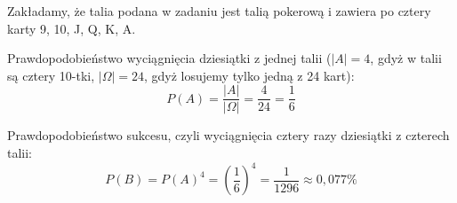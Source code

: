 \medskip
{} 
\medskip

Zakładamy, że talia podana w zadaniu jest talią pokerową i zawiera po cztery karty 9, 10, J, Q, K, A.

Prawdopodobieństwo wyciągnięcia dziesiątki z jednej talii ($|A|=4$, gdyż w talii są cztery 10-tki, $|\Omega|=24$, gdyż losujemy tylko jedną z 24 kart):
$$
P(A)=\frac{|A|}{|\Omega|}=\frac{4}{24}=\frac{1}{6}
$$

Prawdopodobieństwo sukcesu, czyli wyciągnięcia cztery razy dziesiątki z czterech talii:
$$
P(B)=P(A)^4=(\frac{1}{6})^4=\frac{1}{1296}\approx0,077\%
$$
